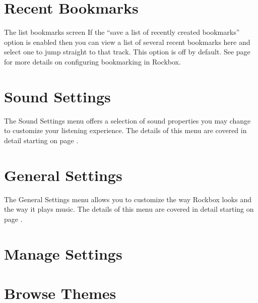 \section {Recent Bookmarks}
%
  {The list bookmarks screen}{}
If the ``save a list of recently created bookmarks'' option is enabled 
then you can view a list of several recent bookmarks here and select one to 
jump straight to that track.  This option is off by default. See page 
\pageref{ref:Bookmarkconfigactual} for more details on configuring bookmarking
in Rockbox.

\section{Sound Settings}
The Sound Settings menu offers a selection of sound properties you may 
change to customize your listening experience.  The details of this menu are 
covered in detail starting on page \pageref{ref:configure_rockbox_sound}. 

\section{General Settings}
The General Settings menu allows you to customize the way Rockbox looks and 
the way it plays music.  The details of this menu are covered in detail 
starting on page \pageref{ref:configure_rockbox_general}. 

\section{Manage Settings}

\section{Browse Themes}
      

